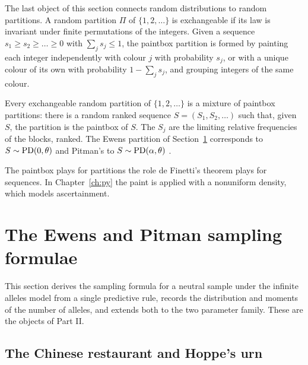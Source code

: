 The last object of this section connects random distributions to random partitions. A random
partition $\Pi$ of $\{1,2,\dots\}$ is exchangeable if its law is invariant under finite
permutations of the integers. Given a sequence $s_1\ge s_2\ge\dots\ge0$ with $\sum_js_j\le1$, the
paintbox partition is formed by painting each integer independently with colour $j$ with
probability $s_j$, or with a unique colour of its own with probability $1-\sum_js_j$, and
grouping integers of the same colour.

\begin{theorem}\label{toolkit:thm:paintbox}
Every exchangeable random partition of $\{1,2,\dots\}$ is a mixture of paintbox partitions: there
is a random ranked sequence $S=(S_1,S_2,\dots)$ such that, given $S$, the partition is the paintbox
of $S$. The $S_j$ are the limiting relative frequencies of the blocks, ranked. The Ewens partition
of Section~\ref{toolkit:sec:esf} corresponds to $S\sim\mathrm{PD}(0,\theta)$ and Pitman's to
$S\sim\mathrm{PD}(\alpha,\theta)$ \citep{toolkit:kingman1978,toolkit:pitman1995}.
\end{theorem}

The paintbox plays for partitions the role de Finetti's theorem plays for sequences. In
Chapter~\ref{ch:py} the paint is applied with a nonuniform density, which models ascertainment.

\section{The Ewens and Pitman sampling formulae}\label{toolkit:sec:esf}

This section derives the sampling formula for a neutral sample under the infinite alleles model
from a single predictive rule, records the distribution and moments of the number of alleles,
and extends both to the two parameter family. These are the objects of Part II.

\subsection{The Chinese restaurant and Hoppe's urn}\label{toolkit:sec:crp}

